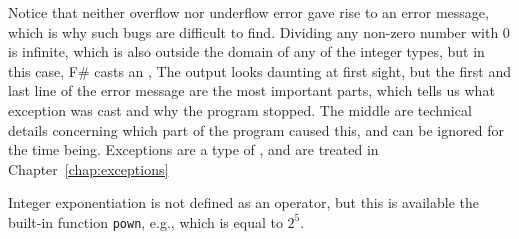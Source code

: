Notice that neither overflow nor underflow error gave rise to an error message, which is why such bugs are difficult to find. 
 Dividing any non-zero number with 0 is infinite, which is also outside the domain of any of the integer types, but in this case, F\# casts an ,
%
%
The output looks daunting at first sight, but the first and last line of the error message are the most important parts, which tells us what exception was cast and why the program stopped. The middle are technical details concerning which part of the program caused this, and can be ignored for the time being. Exceptions are a type of , and are treated in Chapter~\ref{chap:exceptions}

Integer exponentiation is not defined as an operator, but this is available the built-in function \lstinline|pown|, e.g.,
%
%
which is equal to $2^5$.

    
    
